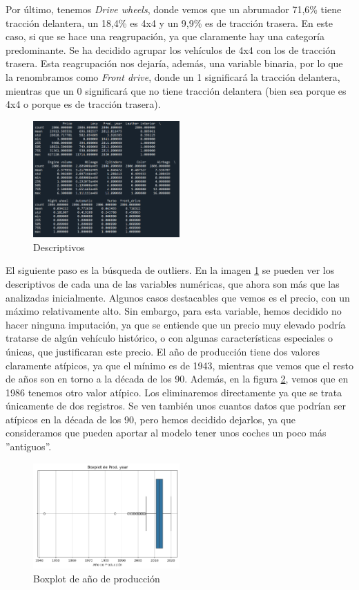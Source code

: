 \documentclass[a4paper,onecolumn]{extarticle}
\begin{document}
\begin{sloppypar}
Por último, tenemos \textit{Drive wheels}, donde vemos que un abrumador 71,6\% tiene tracción delantera, un 18,4\% es 4x4 y un 9,9\% es de tracción trasera. En 
este caso, si que se hace una reagrupación, ya que claramente hay una categoría predominante. Se ha decidido agrupar los vehículos de 4x4 con los de tracción 
trasera. Esta reagrupación nos dejaría, además, una variable binaria, por lo que la renombramos como \textit{Front drive}, donde un 1 significará la tracción 
delantera, mientras que un 0 significará que no tiene tracción delantera (bien sea porque es 4x4 o porque es de tracción trasera).

\begin{figure}[h]
    \centering
    \includegraphics[width=0.5\textwidth]{imgs/descriptivos.png}
    \caption{Descriptivos} \label{fig:descriptivos}
\end{figure}
El siguiente paso es la búsqueda de outliers. En la imagen \ref{fig:descriptivos} se pueden ver los descriptivos de cada una de las variables numéricas, que
ahora son más que las analizadas inicialmente. Algunos casos destacables que vemos es el precio, con un máximo relativamente alto. Sin embargo, para esta variable,
hemos decidido no hacer ninguna imputación, ya que se entiende que un precio muy elevado podría tratarse de algún vehículo histórico, o con algunas características 
especiales o únicas, que justificaran este precio. El año de producción tiene dos valores claramente atípicos, ya que el mínimo es de 1943, mientras que vemos que 
el resto de años son en torno a la década de los 90. Además, en la figura \ref{fig:boxplot}, vemos que en 1986 tenemos otro valor atípico. Los eliminaremos 
directamente ya que se trata únicamente de dos registros. Se ven también unos cuantos datos que podrían ser atípicos en la década de los 90, pero hemos decidido 
dejarlos, ya que consideramos que pueden aportar al modelo tener unos coches un poco más ''antiguos''.
\begin{figure}[h]
    \centering
    \includegraphics[width=0.5\textwidth]{imgs/boxplot.png}
    \caption{Boxplot de año de producción} \label{fig:boxplot}
\end{figure}


\end{sloppypar}
\end{document}

